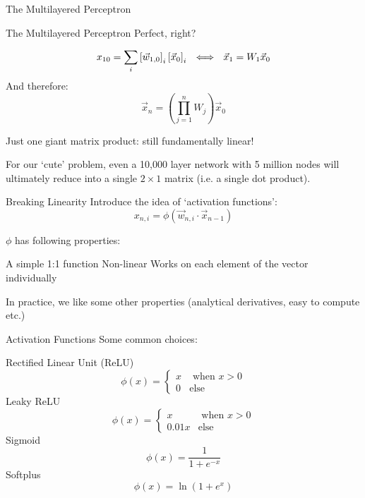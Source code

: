 \documentclass[]{SangerLibrary/sanger-present}
\begin{document}
{\begin{frame}{The Multilayered Perceptron}
	\end{frame}
	}
	\begin{frame}{The Multilayered Perceptron}
		Perfect, right?

		\pause 
		\begin{equation}
			x_{10} = \sum_{i} \left[\vec{w}_{1,0}\right]_i \left[ \vec{x}_0\right]_i ~~\Longleftrightarrow~~ \vec{x}_1 = W_1 \vec{x}_0
		\end{equation}
		\pause And therefore:
		\begin{equation}
			\vec{x}_n = \left(\prod_{j=1}^n W_j \right) \vec{x}_0
		\end{equation}

		\pause Just one giant matrix product: still fundamentally linear! 

		\pause For our `cute' problem, even a 10,000 layer network with 5 million nodes will ultimately reduce into a single $2\times 1$ matrix (i.e. a single dot product).
	\end{frame}

	\begin{frame}{Breaking Linearity}
		Introduce the idea of `activation functions':
		\begin{equation}
			x_{n,i} = \phi\left( \vec{w}_{n,i} \cdot \vec{x}_{n-1} \right)
		\end{equation}

		$\phi$ has following properties:
		\begin{itemize}
			\pitem A simple 1:1 function
			\pitem Non-linear
			\pitem Works on each element of the vector individually
		\end{itemize}

		\pause In practice, we like some other properties (analytical derivatives, easy to compute etc.)
	\end{frame}
	\begin{frame}{Activation Functions}
		Some common choices:
		\begin{itemize}
			\pitem Rectified Linear Unit (ReLU)
			$$ \phi(x) = \begin{cases} x &\text{ when } x > 0 \\ 0 &\text{else} \end{cases}$$
			\pitem  Leaky ReLU
			$$ \phi(x) = \begin{cases} x &\text{ when } x > 0 \\ 0.01x &\text{else} \end{cases}$$
			\pitem Sigmoid
			$$ \phi(x) = \frac{1}{1 + e^{-x}} $$
			\pitem Softplus
			$$ \phi(x) = \ln\left( 1 + e^x \right)$$
		\end{itemize}
	\end{frame}
	
\end{document}
